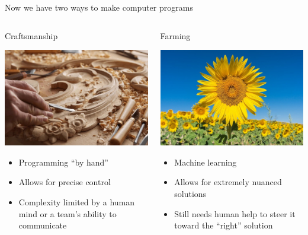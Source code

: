 \documentclass[aspectratio=169]{beamer}
\begin{document}
\begin{frame}{Now we have two ways to make computer programs}
\vspace{-0.5 cm}

\begin{columns}[t]
\begin{center}
\Large Craftsmanship

\vspace{0.25 cm}
\includegraphics[width=0.8\linewidth]{img/craftsmanship.jpg}

\normalsize
\vspace{0.25 cm}
\begin{itemize}
\item Programming ``by hand''
\item Allows for precise control
\item Complexity limited by a human mind or a team's ability to communicate
\end{itemize}
\end{center}

\begin{center}
\Large Farming

\vspace{0.25 cm}
\includegraphics[width=0.8\linewidth]{img/farming.jpg}

\normalsize
\vspace{0.25 cm}
\begin{itemize}
\item Machine learning
\item Allows for extremely nuanced solutions
\item Still needs human help to steer it toward the ``right'' solution
\end{itemize}
\end{center}

\end{columns}
\end{frame}
\end{document}
